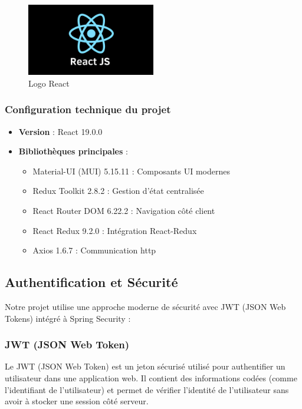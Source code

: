 \documentclass[12pt,a4paper]{report}
\begin{document}
\begin{figure}[H]
\centering
\includegraphics[width=0.5\textwidth]{latex_media/media/image24.png}
\caption{Logo React}
\label{fig:logo-react}
\end{figure}

\subsubsection{Configuration technique du projet}

\begin{itemize}
\item \textbf{Version} : React 19.0.0
\item \textbf{Bibliothèques principales} :
  \begin{itemize}
  \item Material-UI (MUI) 5.15.11 : Composants UI modernes
  \item Redux Toolkit 2.8.2 : Gestion d'état centralisée
  \item React Router DOM 6.22.2 : Navigation côté client
  \item React Redux 9.2.0 : Intégration React-Redux
  \item Axios 1.6.7 : Communication http
  \end{itemize}
\end{itemize}

\subsection{Authentification et Sécurité}

Notre projet utilise une approche moderne de sécurité avec JWT (JSON Web Tokens) intégré à Spring Security :

\subsubsection{JWT (JSON Web Token)}

Le JWT (JSON Web Token) est un jeton sécurisé utilisé pour authentifier un utilisateur dans une application web. Il contient des informations codées (comme l'identifiant de l'utilisateur) et permet de vérifier l'identité de l'utilisateur sans avoir à stocker une session côté serveur.
\end{document}
